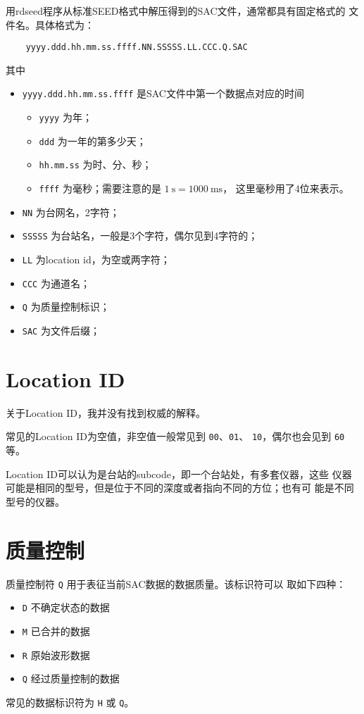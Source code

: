 用rdseed程序从标准SEED格式中解压得到的SAC文件，通常都具有固定格式的
文件名。具体格式为：
\begin{verbatim}
    yyyy.ddd.hh.mm.ss.ffff.NN.SSSSS.LL.CCC.Q.SAC
\end{verbatim}
其中
\begin{itemize}
\item \texttt{yyyy.ddd.hh.mm.ss.ffff} 是SAC文件中第一个数据点对应的时间
    \begin{itemize}
    \item \texttt{yyyy} 为年；
    \item \texttt{ddd} 为一年的第多少天；
    \item \texttt{hh.mm.ss} 为时、分、秒；
    \item \texttt{ffff} 为毫秒；需要注意的是 $\SI{1}{\s}=\SI{1000}{\ms}$，
        这里毫秒用了4位来表示。
    \end{itemize}
\item \texttt{NN} 为台网名，2字符；
\item \texttt{SSSSS} 为台站名，一般是3个字符，偶尔见到4字符的；
\item \texttt{LL} 为location id，为空或两字符；
\item \texttt{CCC} 为通道名；
\item \texttt{Q} 为质量控制标识；
\item \texttt{SAC} 为文件后缀；
\end{itemize}

\section{Location ID}
关于Location ID，我并没有找到权威的解释。

常见的Location ID为空值，非空值一般常见到 \texttt{00}、\texttt{01}、
\texttt{10}，偶尔也会见到 \texttt{60} 等。

Location ID可以认为是台站的subcode，即一个台站处，有多套仪器，这些
仪器可能是相同的型号，但是位于不同的深度或者指向不同的方位；也有可
能是不同型号的仪器。

\section{质量控制}
质量控制符 \texttt{Q} 用于表征当前SAC数据的数据质量。该标识符可以
取如下四种：
\begin{itemize}
\item \texttt{D} 不确定状态的数据
\item \texttt{M} 已合并的数据
\item \texttt{R} 原始波形数据
\item \texttt{Q} 经过质量控制的数据
\end{itemize}
常见的数据标识符为 \texttt{H} 或 \texttt{Q}。

